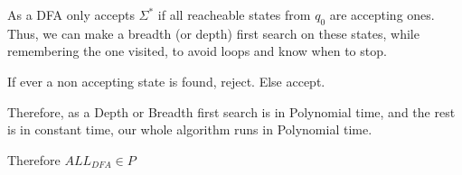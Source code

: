 
As a DFA only accepts $\Sigma^*$ if all reacheable states from $q_0$ are accepting ones. Thus, we can make a breadth (or depth) first search on these states, while remembering the one visited, to avoid loops and know when to stop.

If ever a non accepting state is found, reject. Else accept.

Therefore, as a Depth or Breadth first search is in Polynomial time, and the rest is in constant time, our whole algorithm runs in Polynomial time.

Therefore $ALL_{DFA} \in P$